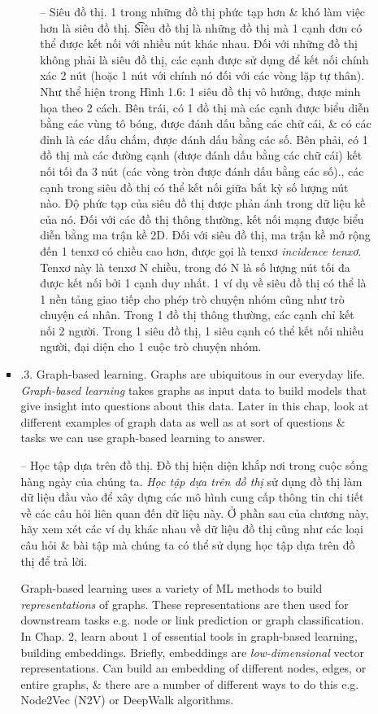 \documentclass{article}
\begin{document}
\begin{itemize}
\begin{itemize}
\begin{itemize}
\begin{itemize}
                -- {\sf Siêu đồ thị.} 1 trong những đồ thị phức tạp hơn \& khó làm việc hơn là siêu đồ thị. {\t Siêu đồ thị} là những đồ thị mà 1 cạnh đơn có thể được kết nối với nhiều nút khác nhau. Đối với những đồ thị không phải là siêu đồ thị, các cạnh được sử dụng để kết nối chính xác 2 nút (hoặc 1 nút với chính nó đối với các vòng lặp tự thân). Như thể hiện trong {\sf Hình 1.6: 1 siêu đồ thị vô hướng, được minh họa theo 2 cách. Bên trái, có 1 đồ thị mà các cạnh được biểu diễn bằng các vùng tô bóng, được đánh dấu bằng các chữ cái, \& có các đỉnh là các dấu chấm, được đánh dấu bằng các số. Bên phải, có 1 đồ thị mà các đường cạnh (được đánh dấu bằng các chữ cái) kết nối tối đa 3 nút (các vòng tròn được đánh dấu bằng các số).}, các cạnh trong siêu đồ thị có thể kết nối giữa bất kỳ số lượng nút nào. Độ phức tạp của siêu đồ thị được phản ánh trong dữ liệu kề của nó. Đối với các đồ thị thông thường, kết nối mạng được biểu diễn bằng ma trận kề 2D. Đối với siêu đồ thị, ma trận kề mở rộng đến 1 tenxơ có chiều cao hơn, được gọi là tenxơ {\it incidence tenxơ}. Tenxơ này là tenxơ N chiều, trong đó N là số lượng nút tối đa được kết nối bởi 1 cạnh duy nhất. 1 ví dụ về siêu đồ thị có thể là 1 nền tảng giao tiếp cho phép trò chuyện nhóm cũng như trò chuyện cá nhân. Trong 1 đồ thị thông thường, các cạnh chỉ kết nối 2 người. Trong 1 siêu đồ thị, 1 siêu cạnh có thể kết nối nhiều người, đại diện cho 1 cuộc trò chuyện nhóm.
            \end{itemize}
            \item {.3. Graph-based learning.} Graphs are ubiquitous in our everyday life. {\it Graph-based learning} takes graphs as input data to build models that give insight into questions about this data. Later in this chap, look at different examples of graph data as well as at sort of questions \& tasks we can use graph-based learning to answer.

            -- {\sf Học tập dựa trên đồ thị.} Đồ thị hiện diện khắp nơi trong cuộc sống hàng ngày của chúng ta. {\it Học tập dựa trên đồ thị} sử dụng đồ thị làm dữ liệu đầu vào để xây dựng các mô hình cung cấp thông tin chi tiết về các câu hỏi liên quan đến dữ liệu này. Ở phần sau của chương này, hãy xem xét các ví dụ khác nhau về dữ liệu đồ thị cũng như các loại câu hỏi \& bài tập mà chúng ta có thể sử dụng học tập dựa trên đồ thị để trả lời.

            Graph-based learning uses a variety of ML methods to build {\it representations} of graphs. These representations are then used for downstream tasks e.g. node or link prediction or graph classification. In Chap. 2, learn about 1 of essential tools in graph-based learning, building embeddings. Briefly, embeddings are {\it low-dimensional} vector representations. Can build an embedding of different nodes, edges, or entire graphs, \& there are a number of different ways to do this e.g. Node2Vec (N2V) or DeepWalk algorithms.


\end{itemize}
\end{itemize}
\end{itemize}
\end{document}
